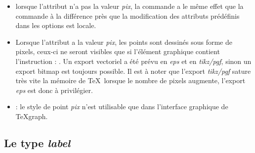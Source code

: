 \begin{itemize}
 \item\desc lorsque l'attribut  n'a pas la valeur \emph{pix}, la commande a le même effet que la commande  à la différence près que la modification des attributs prédéfinis dans les options est locale.
 \item Lorsque l'attribut  a la valeur \emph{pix}, les points sont dessinés sous forme de pixels, ceux-ci ne seront visibles que si l'élément graphique contient l'instruction : . Un export vectoriel a été prévu en \emph{eps} et en \emph{tikz/pgf}, sinon un export bitmap est toujours possible. Il est à noter que l'export \emph{tikz/pgf} sature très vite la mémoire de \TeX\ lorsque le nombre de pixels augmente, l'export \emph{eps} est donc à privilégier.
 \item {}: le style de point \emph{pix} n'est utilisable que dans l'interface graphique de TeXgraph.
\end{itemize}

\subsection{Le type \emph{label}}\label{typelabel}

{\centering {}\par}

